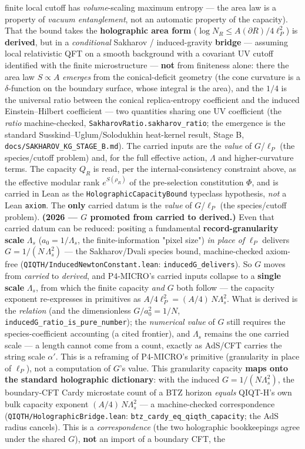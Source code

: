 \documentclass[11pt,a4paper]{article}
\begin{document}
finite local cutoff has \emph{volume}-scaling maximum entropy — the area law is a property of \emph{vacuum entanglement}, not an automatic property of the capacity). That the bound takes the \textbf{holographic area form} ($\log N_R \le A(\partial R)/4\ell_P^2$) is \textbf{derived}, but in a \emph{conditional} Sakharov / induced-gravity \textbf{bridge} — assuming local relativistic QFT on a smooth background with a covariant UV cutoff identified with the finite microstructure — \textbf{not} from finiteness alone: there the area law $S\propto A$ \emph{emerges} from the conical-deficit geometry (the cone curvature is a $\delta$-function on the boundary surface, whose integral is the area), and the $1/4$ is the universal ratio between the conical replica-entropy coefficient and the induced Einstein–Hilbert coefficient — two quantities sharing one UV coefficient (the \emph{ratio} machine-checked, \texttt{SakharovRatio.sakharov\_ratio}; the emergence is the standard Susskind–Uglum/Solodukhin heat-kernel result, Stage B, \texttt{docs/SAKHAROV\_KG\_STAGE\_B.md}). The carried inputs are the \emph{value} of $G$/$\ell_P$ (the species/cutoff problem) and, for the full effective action, $\Lambda$ and higher-curvature terms. The capacity $Q_R$ is read, per the internal-consistency constraint above, as the effective modular rank $e^{S(\rho_R)}$ of the pre-selection constitution $\Phi$, and is carried in Lean as the \texttt{HolographicCapacityBound} typeclass hypothesis, \emph{not} a Lean \texttt{axiom}. The \textbf{only} carried datum is the \emph{value} of $G$/$\ell_P$ (the species/cutoff problem). \textbf{(2026 — $G$ promoted from carried to derived.)} Even that carried datum can be reduced: positing a fundamental \textbf{record-granularity scale} $\Lambda_s$ ($a_0 = 1/\Lambda_s$, the finite-information "pixel size") \emph{in place of} $\ell_P$ delivers $G = 1/(N\,\Lambda_s^2)$ — the Sakharov/Dvali species bound, machine-checked axiom-free (\texttt{QIQTH/InducedNewtonConstant.lean}: \texttt{inducedG\_delivers}). So $G$ moves from \emph{carried} to \emph{derived}, and P4-MICRO's carried inputs collapse to a \textbf{single scale} $\Lambda_s$, from which the finite capacity \emph{and} $G$ both follow — the capacity exponent re-expresses in primitives as $A/4\ell_P^2 = (A/4)\,N\Lambda_s^2$. What is derived is the \emph{relation} (and the dimensionless $G/a_0^2 = 1/N$, \texttt{inducedG\_ratio\_is\_pure\_number}); the \emph{numerical value} of $G$ still requires the species-coefficient accounting (a cited frontier), and $\Lambda_s$ remains the one carried scale — a length cannot come from a count, exactly as AdS/CFT carries the string scale $\alpha'$. This is a reframing of P4-MICRO's primitive (granularity in place of $\ell_P$), not a computation of $G$'s value. This granularity capacity \textbf{maps onto the standard holographic dictionary}: with the induced $G = 1/(N\Lambda_s^2)$, the boundary-CFT Cardy microstate count of a BTZ horizon \emph{equals} QIQT-H's own bulk capacity exponent $(A/4)\,N\Lambda_s^2$ — a machine-checked correspondence (\texttt{QIQTH/HolographicBridge.lean}: \texttt{btz\_cardy\_eq\_qiqth\_capacity}; the AdS radius cancels). This is a \emph{correspondence} (the two holographic bookkeepings agree under the shared $G$), \textbf{not} an import of a boundary CFT, the 
\end{document}
